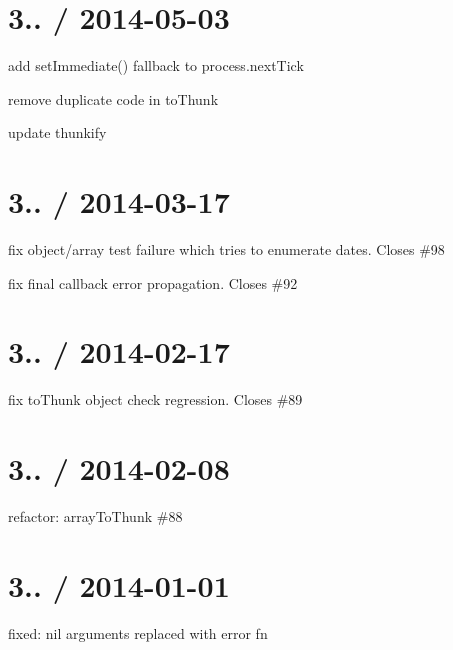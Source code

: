 \section*{3.. / 2014-\/05-\/03 }


\begin{DoxyItemize}
\item add {\ttfamily set\+Immediate()} fallback to {\ttfamily process.\+next\+Tick}
\item remove duplicate code in to\+Thunk
\item update thunkify
\end{DoxyItemize}

\section*{3.. / 2014-\/03-\/17 }


\begin{DoxyItemize}
\item fix object/array test failure which tries to enumerate dates. Closes \#98
\item fix final callback error propagation. Closes \#92
\end{DoxyItemize}

\section*{3.. / 2014-\/02-\/17 }


\begin{DoxyItemize}
\item fix to\+Thunk object check regression. Closes \#89
\end{DoxyItemize}

\section*{3.. / 2014-\/02-\/08 }


\begin{DoxyItemize}
\item refactor\+: array\+To\+Thunk  \#88
\end{DoxyItemize}

\section*{3.. / 2014-\/01-\/01 }


\begin{DoxyItemize}
\item fixed\+: nil arguments replaced with error fn
\end{DoxyItemize}

